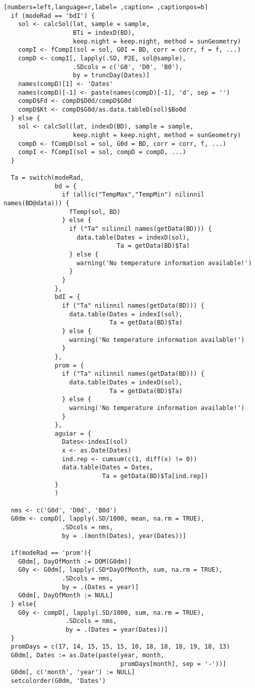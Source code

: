 \begin{lstlisting}[numbers=left,language=r,label= ,caption= ,captionpos=b]
  if (modeRad == 'bdI') {
    sol <- calcSol(lat, sample = sample,
                   BTi = indexD(BD),
                   keep.night = keep.night, method = sunGeometry)
    compI <- fCompI(sol = sol, G0I = BD, corr = corr, f = f, ...)
    compD <- compI[, lapply(.SD, P2E, sol@sample),
                   .SDcols = c('G0', 'D0', 'B0'),
                   by = truncDay(Dates)]
    names(compD)[1] <- 'Dates'
    names(compD)[-1] <- paste(names(compD)[-1], 'd', sep = '')
    compD$Fd <- compD$D0d/compD$G0d
    compD$Kt <- compD$G0d/as.data.tableD(sol)$Bo0d
  } else { 
    sol <- calcSol(lat, indexD(BD), sample = sample,
                   keep.night = keep.night, method = sunGeometry)
    compD <- fCompD(sol = sol, G0d = BD, corr = corr, f, ...)
    compI <- fCompI(sol = sol, compD = compD, ...)
  }

  Ta = switch(modeRad,
              bd = {
                if (all(c("TempMax","TempMin") nilinnil names(BD@data))) {
                  fTemp(sol, BD)
                } else {
                  if ("Ta" nilinnil names(getData(BD))) {
                    data.table(Dates = indexD(sol),
                               Ta = getData(BD)$Ta)
                  } else {
                    warning('No temperature information available!')
                  }
                }
              },
              bdI = {
                if ("Ta" nilinnil names(getData(BD))) {
                  data.table(Dates = indexI(sol),
                             Ta = getData(BD)$Ta)
                } else {
                  warning('No temperature information available!')
                }
              },
              prom = {
                if ("Ta" nilinnil names(getData(BD))) {
                  data.table(Dates = indexD(sol),
                             Ta = getData(BD)$Ta)
                } else {
                  warning('No temperature information available!')
                }                  
              },
              aguiar = {
                Dates<-indexI(sol)	
                x <- as.Date(Dates)
                ind.rep <- cumsum(c(1, diff(x) != 0))
                data.table(Dates = Dates,
                           Ta = getData(BD)$Ta[ind.rep])
              }
              )

  nms <- c('G0d', 'D0d', 'B0d')
  G0dm <- compD[, lapply(.SD/1000, mean, na.rm = TRUE),
                .SDcols = nms,
                by = .(month(Dates), year(Dates))]

  if(modeRad == 'prom'){
    G0dm[, DayOfMonth := DOM(G0dm)]
    G0y <- G0dm[, lapply(.SD*DayOfMonth, sum, na.rm = TRUE),
                .SDcols = nms,
                by = .(Dates = year)]
    G0dm[, DayOfMonth := NULL]        
  } else{
    G0y <- compD[, lapply(.SD/1000, sum, na.rm = TRUE),
                 .SDcols = nms,
                 by = .(Dates = year(Dates))]
  }
  promDays = c(17, 14, 15, 15, 15, 10, 18, 18, 18, 19, 18, 13)
  G0dm[, Dates := as.Date(paste(year, month,
                                promDays[month], sep = '-'))]
  G0dm[, c('month', 'year') := NULL]
  setcolorder(G0dm, 'Dates')


\end{lstlisting}
